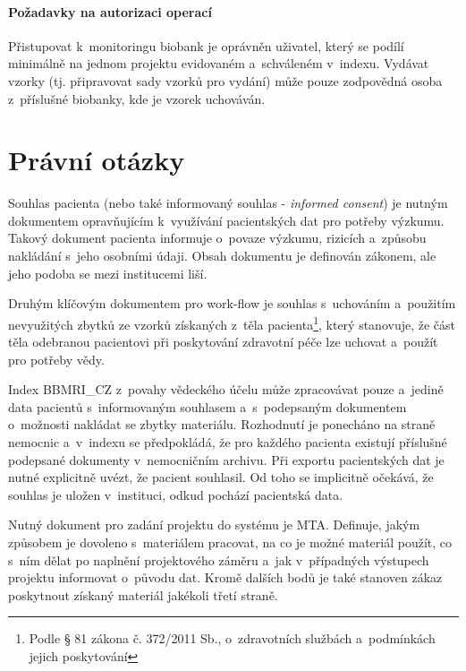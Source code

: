 \documentclass[11pt,draft,oneside]{fithesis2}
\newcommand{\ProjectName}{BBMRI\_CZ\xspace}
\begin{document}
\paragraph*{Požadavky na autorizaci operací}
Přistupovat k~monitoringu biobank je oprávněn uživatel, který se podílí minimálně na jednom projektu evidovaném a~schváleném v~indexu.
Vydávat vzorky (tj. připravovat sady vzorků pro vydání) může pouze zodpovědná osoba z~příslušné biobanky, kde je vzorek uchováván.

\section{Právní otázky}\label{chapter:analysis:section:legal}
Souhlas pacienta (nebo také informovaný souhlas - \textit{informed consent}) je nutným dokumentem opravňujícím k~využívání pacientských dat pro potřeby výzkumu. Takový dokument pacienta informuje o~povaze výzkumu, rizicích a~způsobu nakládání s~jeho osobními údaji. Obsah dokumentu je definován zákonem, ale jeho podoba se mezi institucemi liší. 

Druhým klíčovým dokumentem pro work-flow je souhlas s~uchováním a~použitím nevyužitých zbytků ze vzorků získaných z~těla pacienta\footnote{Podle § 81 zákona č. 372/2011 Sb., o~zdravotních službách a~podmínkách jejich poskytování}, který stanovuje, že část těla odebranou pacientovi při poskytování zdravotní péče lze uchovat a~použít pro potřeby vědy. 

Index \ProjectName z~povahy vědeckého účelu může zpracovávat pouze a~jedině data pacientů s~informovaným souhlasem a~s~podepsaným dokumentem o~možnosti nakládat se zbytky materiálu. Rozhodnutí je ponecháno na straně nemocnic a~v~indexu se předpokládá, že pro každého pacienta existují příslušné podepsané dokumenty v~nemocničním archivu.
Při exportu pacientských dat je nutné explicitně uvézt, že pacient souhlasil. Od toho se implicitně očekává, že souhlas je uložen v~instituci, odkud pochází pacientská data.

Nutný dokument pro zadání projektu do systému je MTA. Definuje, jakým způsobem je dovoleno s~materiálem pracovat, na co je možné materiál použít, co s~ním dělat po naplnění projektového záměru a~jak v~případných výstupech projektu informovat o~původu dat. Kromě dalších bodů je také stanoven zákaz poskytnout získaný materiál jakékoli třetí straně.
\end{document}
